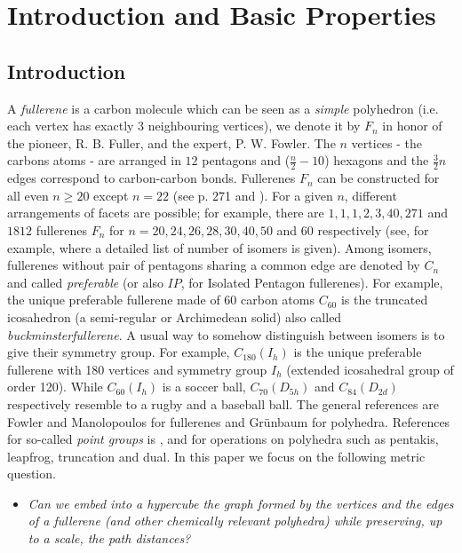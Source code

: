 
\tableofcontents

\pagestyle{plain}
\section{Introduction and Basic Properties}\label{intro}
\subsection{Introduction}\label{kointro}
A {\it fullerene} is a  
carbon molecule which can be seen as a {\em simple} polyhedron
(i.e. each vertex has exactly 3 neighbouring vertices), 
we denote it by $F_n$ in honor of the pioneer, {\sc R. B. Fuller}, and the 
expert, {\sc P. W. Fowler}. 
The $n$ vertices - the carbons atoms -
are arranged in $12$ pentagons and ($\frac{n}{2}-10$) hexagons and the $\frac{3}{2}n$ edges 
correspond to carbon-carbon bonds. Fullerenes $F_n$ can be constructed for all even $n\geq 20$ 
except $n=22$ (see \cite{grun} p. 271 and \cite{mal}).
For a given $n$, different arrangements of facets are possible; for example, there are $1,1,1,2,3,40,271$
and $1812$ fullerenes $F_n$ for $n=20,24,26,28,30,40,50$ and $60$ respectively 
(see, for example, \cite{brdr} where a detailed list of number of 
isomers is given).
Among isomers, fullerenes without pair of pentagons sharing a common edge are denoted 
by $C_n$ and called {\em preferable} (or also $IP$, for Isolated Pentagon 
fullerenes). 
For example, the unique preferable fullerene made of
$60$ carbon atoms $C_{60}$ is the truncated icosahedron (a semi-regular or Archimedean solid)  
also called {\em buckminsterfullerene}. 
A usual way to somehow distinguish between isomers is to give their
symmetry group. For example, $C_{180}(I_h)$ is the unique preferable 
fullerene with 180 vertices and symmetry group $I_h$ 
(extended icosahedral group of order 120). 
While $C_{60}(I_h)$ is a soccer ball, $C_{70}(D_{5h})$ and $C_{84}(D_{2d})$ 
respectively resemble to a rugby and a baseball ball. 
The general references are {\sc Fowler and Manolopoulos} \cite{atlas} for 
fullerenes and
{\sc Gr\"unbaum} \cite{grun} for polyhedra. 
References for so-called {\em point groups} is \cite{pgr}, and \cite{fowpi,grun}
for operations on polyhedra such as 
pentakis, leapfrog, truncation and dual.
In this paper we focus on the following metric question.
\begin{itemize}
\item[] {\em Can we embed into a hypercube the graph formed
 by the vertices and the edges of a fullerene (and other chemically relevant polyhedra) while 
preserving, up to a scale, the path distances?}
\end{itemize}

